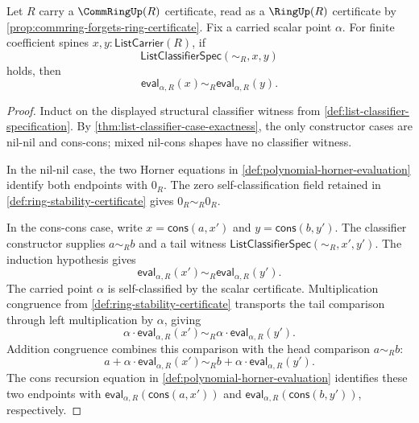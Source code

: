 \begin{lemma}
\label{lem:horner-evaluation-structural-classifier}
Let $R$ carry a $\CommRingUp(R)$ certificate, read as a $\RingUp(R)$ certificate by \autoref{prop:commring-forgets-ring-certificate}. Fix a carried scalar point $\alpha$. For finite coefficient spines $x,y:\mathsf{ListCarrier}(R)$, if
$$
\mathsf{ListClassifierSpec}(\sim_R,x,y)
$$
holds, then
$$
\mathsf{eval}_{\alpha,R}(x)\sim_R\mathsf{eval}_{\alpha,R}(y).
$$
\end{lemma}
\begin{proof}
Induct on the displayed structural classifier witness from \autoref{def:list-classifier-specification}. By \autoref{thm:list-classifier-case-exactness}, the only constructor cases are nil-nil and cons-cons; mixed nil-cons shapes have no classifier witness.

In the nil-nil case, the two Horner equations in \autoref{def:polynomial-horner-evaluation} identify both endpoints with $0_R$. The zero self-classification field retained in \autoref{def:ring-stability-certificate} gives $0_R\sim_R0_R$.

In the cons-cons case, write $x=\mathsf{cons}(a,x')$ and $y=\mathsf{cons}(b,y')$. The classifier constructor supplies $a\sim_R b$ and a tail witness $\mathsf{ListClassifierSpec}(\sim_R,x',y')$. The induction hypothesis gives
$$
\mathsf{eval}_{\alpha,R}(x')\sim_R\mathsf{eval}_{\alpha,R}(y').
$$
The carried point $\alpha$ is self-classified by the scalar certificate. Multiplication congruence from \autoref{def:ring-stability-certificate} transports the tail comparison through left multiplication by $\alpha$, giving
$$
\alpha\cdot\mathsf{eval}_{\alpha,R}(x')\sim_R
\alpha\cdot\mathsf{eval}_{\alpha,R}(y').
$$
Addition congruence combines this comparison with the head comparison $a\sim_Rb$:
$$
a+\alpha\cdot\mathsf{eval}_{\alpha,R}(x')\sim_R
b+\alpha\cdot\mathsf{eval}_{\alpha,R}(y').
$$
The cons recursion equation in \autoref{def:polynomial-horner-evaluation} identifies these two endpoints with $\mathsf{eval}_{\alpha,R}(\mathsf{cons}(a,x'))$ and $\mathsf{eval}_{\alpha,R}(\mathsf{cons}(b,y'))$, respectively.
\end{proof}

